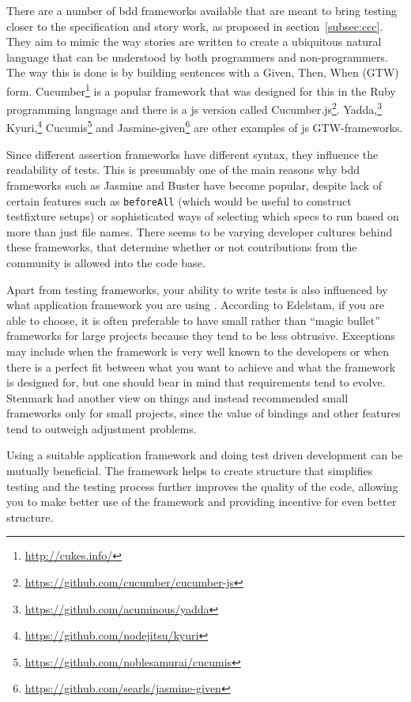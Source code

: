 \documentclass[11pt]{article}
\begin{document}
There are a number of \gls{bdd} frameworks available that are meant to bring testing closer to the specification and story work, as proposed in section~\ref{subsec:ccc}. They aim to mimic the way stories are written to create a ubiquitous natural language that can be understood by both programmers and non-programmers. The way this is done is by building sentences with a Given, Then, When (GTW) form. Cucumber\footnote{\url{http://cukes.info/}} is a popular framework that was designed for this in the Ruby programming language and there is a \gls{js} version called Cucumber.js\footnote{\url{https://github.com/cucumber/cucumber-js}}.
Yadda,\footnote{\url{https://github.com/acuminous/yadda}}
Kyuri,\footnote{\url{https://github.com/nodejitsu/kyuri}}
Cucumis\footnote{\url{https://github.com/noblesamurai/cucumis}} and
Jasmine-given\footnote{\url{https://github.com/searls/jasmine-given}}
are other examples of \gls{js} GTW-frameworks. \cite[section 8.4]{BDDJS}

Since different assertion frameworks have different syntax, they influence the readability of tests. This is presumably one of the main reasons why \gls{bdd} frameworks such as Jasmine and Buster have become popular, despite lack of certain features such as \texttt{beforeAll} (which would be useful to construct \gls{testfixture} setups) or sophisticated ways of selecting which specs to run based on more than just file names. There seems to be varying developer cultures behind these frameworks, that determine whether or not contributions from the community is allowed into the code base. \cite[question~7]{Ahnve}\cite[question~5-6]{Rovegard}

Apart from testing frameworks, your ability to write tests is also influenced by what application framework you are using \cite[question~8]{Ahnve}. According to Edelstam, if you are able to choose, it is often preferable to have small rather than ``magic bullet'' frameworks for large projects because they tend to be less obtrusive. Exceptions may include when the framework is very well known to the developers or when there is a perfect fit between what you want to achieve and what the framework is designed for, but one should bear in mind that requirements tend to evolve. \cite[questions~48-50]{Edelstam} Stenmark had another view on things and instead recommended small frameworks only for small projects, since the value of bindings and other features tend to outweigh adjustment problems. \cite[questions~12-14]{Stenmark}

Using a suitable application framework and doing test driven development can be mutually beneficial. The framework helps to create structure that simplifies testing and the testing process further improves the quality of the code, allowing you to make better use of the framework and providing incentive for even better structure. \cite[question~15]{Stenmark}
\end{document}
